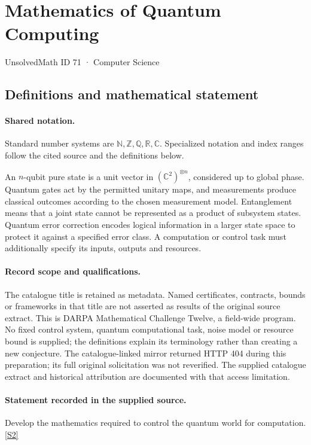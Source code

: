 \documentclass[11pt]{article}
\newcommand{\sref}[2]{\hyperlink{source:#1:#2}{[S#2]}}
\begin{document}
\setcounter{section}{70}
\section{Mathematics of Quantum Computing}\label{71}
{\small\sffamily UnsolvedMath ID 71 · Computer Science}
\subsection{Definitions and mathematical statement}

\paragraph{Shared notation.}Standard number systems are $\mathbb N,\mathbb Z,\mathbb Q,\mathbb R,\mathbb C$. Specialized notation and index ranges follow the cited source and the definitions below.


An $n$-qubit pure state is a unit vector in $(\mathbb C^2)^{\otimes n}$, considered up to global phase. Quantum gates act by the permitted unitary maps, and measurements produce classical outcomes according to the chosen measurement model. Entanglement means that a joint state cannot be represented as a product of subsystem states. Quantum error correction encodes logical information in a larger state space to protect it against a specified error class. A computation or control task must additionally specify its inputs, outputs and resources.
\paragraph{Record scope and qualifications.}
The catalogue title is retained as metadata. Named certificates, contracts, bounds or frameworks in that title are not asserted as results of the original source extract.
This is DARPA Mathematical Challenge Twelve, a field-wide program. No fixed control system, quantum computational task, noise model or resource bound is supplied; the definitions explain its terminology rather than creating a new conjecture. The catalogue-linked mirror returned HTTP 404 during this preparation; its full original solicitation was not reverified. The supplied catalogue extract and historical attribution are documented with that access limitation.
\paragraph{Statement recorded in the supplied source.}
Develop the mathematics required to control the quantum world for computation. \sref{71}{2}
\end{document}
